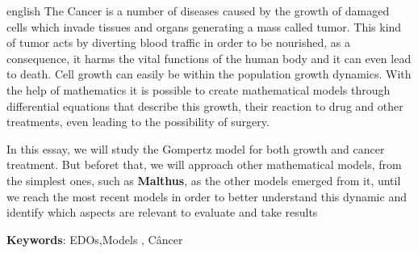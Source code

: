 \documentclass[
	article,			%
	11pt,				%
	oneside,			%
	a4paper,			%
	english,			%
	brazil,				%
	sumario=tradicional
	]{abntex2}
\begin{document}
\begin{resumoumacoluna}
 \begin{otherlanguage*}{english}
 The Cancer is a number of diseases caused by the growth of damaged cells which invade tissues and organs generating a mass called tumor. This kind of tumor acts by diverting blood traffic in order to be nourished, as a consequence, it harms the vital functions of the human body and it can even lead to death.
Cell growth can easily be within the population growth dynamics. With the help of mathematics it is possible to create mathematical models through differential equations that describe this growth, their reaction to drug and other treatments, even leading to the possibility of surgery.

In this essay, we will study the Gompertz model for both growth and cancer treatment. But beforet that, we will approach other mathematical models, from the simplest ones, such as \textbf{Malthus}, as the other models emerged from it, until we reach the most recent models in order to better understand this dynamic and identify which aspects are relevant to evaluate and take results



   \vspace{\onelineskip}

   \noindent
   \textbf{Keywords}: EDOs,Models , Câncer
 \end{otherlanguage*}
\end{resumoumacoluna}



\textual



\newpage


\newpage


\newpage


\newpage


%
\newpage

\end{document}
